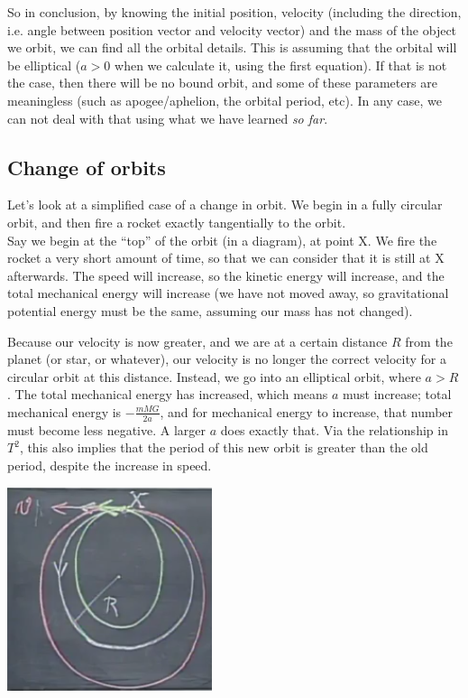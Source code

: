 \documentclass[8.01x]{subfiles}
\begin{document}
So in conclusion, by knowing the initial position, velocity (including the direction, i.e. angle between position vector and velocity vector) and the mass of the object we orbit, we can find all the orbital details. This is assuming that the orbital will be elliptical ($a > 0$ when we calculate it, using the first equation). If that is not the case, then there will be no bound orbit, and some of these parameters are meaningless (such as apogee/aphelion, the orbital period, etc). In any case, we can not deal with that using what we have learned \emph{so far}.

\subsection{Change of orbits}

Let's look at a simplified case of a change in orbit. We begin in a fully circular orbit, and then fire a rocket exactly tangentially to the orbit.\\
Say we begin at the ``top'' of the orbit (in a diagram), at point X. We fire the rocket a very short amount of time, so that we can consider that it is still at X afterwards. The speed will increase, so the kinetic energy will increase, and the total mechanical energy will increase (we have not moved away, so gravitational potential energy must be the same, assuming our mass has not changed).

Because our velocity is now greater, and we are at a certain distance $R$ from the planet (or star, or whatever), our velocity is no longer the correct velocity for a circular orbit at this distance. Instead, we go into an elliptical orbit, where $a > R$. The total mechanical energy has increased, which means $a$ must increase; total mechanical energy is $-\frac{m M G}{2 a}$, and for mechanical energy to increase, that number must become less negative. A larger $a$ does exactly that. Via the relationship in $T^2$, this also implies that the period of this new orbit is greater than the old period, despite the increase in speed.

\begin{center}
\includegraphics[scale=0.6]{Graphics/lec22_orbit_change}
\end{center}
\end{document}

